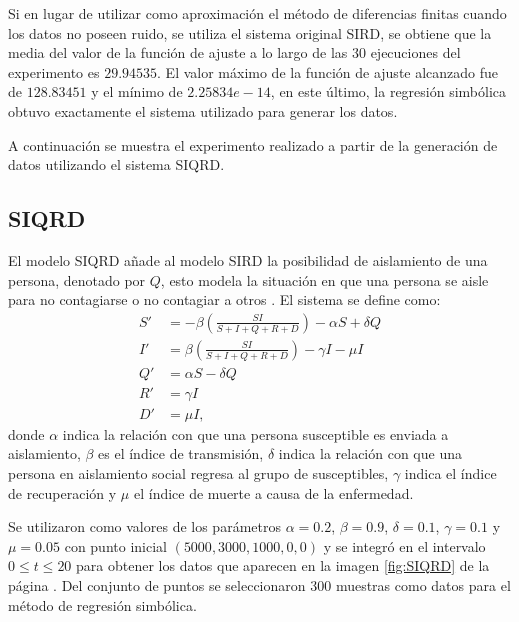 Si en lugar de utilizar como aproximación el método de diferencias finitas cuando los datos no poseen ruido, se utiliza el sistema original SIRD, se obtiene que la media del valor de la función de ajuste a lo largo de las 30 ejecuciones del experimento es $29.94535$. El valor máximo de la función de ajuste alcanzado fue de $128.83451$ y el mínimo de $2.25834e-14$, en este último, la regresión simbólica obtuvo exactamente el sistema utilizado para generar los datos.

A continuación se muestra el experimento realizado a partir de la generación de datos utilizando el sistema SIQRD.

\subsection{SIQRD}

El modelo SIQRD añade al modelo SIRD la posibilidad de aislamiento de una persona, denotado por $Q$, esto modela la situación en que una persona se aisle para no contagiarse o no contagiar a otros \cite{molter2021mathematical}. El sistema se define como:
\begin{align*}
    S' & = -\beta (\frac{S I}{S + I + Q + R + D}) - \alpha S + \delta Q \\
    I' & = \beta (\frac{S I}{S + I + Q + R + D}) - \gamma I - \mu I     \\
    Q' & = \alpha S - \delta Q                                          \\
    R' & = \gamma I                                                     \\
    D' & = \mu I,
\end{align*}
donde $\alpha$ indica la relación con que una persona susceptible es enviada a aislamiento, $\beta$ es el índice de transmisión, $\delta$ indica la relación con que una persona en aislamiento social regresa al grupo de susceptibles, $\gamma$ indica el índice de recuperación y $\mu$ el índice de muerte a causa de la enfermedad.

Se utilizaron como valores de los parámetros $\alpha = 0.2$, $\beta = 0.9$, $\delta = 0.1$, $\gamma = 0.1$ y $\mu = 0.05$ con punto inicial $(5000, 3000, 1000, 0, 0)$ y se integró en el intervalo $0 \leq t \leq 20$ para obtener los datos que aparecen en la imagen \ref{fig:SIQRD} de la página \pageref{fig:SIQRD}. Del conjunto de puntos se seleccionaron 300 muestras como datos para el método de regresión simbólica.

